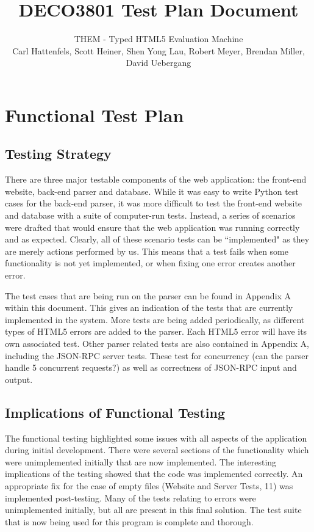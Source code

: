 \documentclass[10pt]{article}
\title{\bf DECO3801 Test Plan Document}
\author{\normalsize THEM - Typed HTML5 Evaluation Machine \\ \normalsize Carl Hattenfels, Scott Heiner, Shen Yong Lau, Robert Meyer, Brendan Miller, David Uebergang}
\date{}
\begin{document}
\maketitle
\tableofcontents
\newpage

\section{Functional Test Plan}

\subsection{Testing Strategy}

There are three major testable components of the web application: the front-end website, back-end parser and database. While it was easy to write Python test cases for the back-end parser, it was more difficult to test the front-end website and database with a suite of computer-run tests. Instead, a series of scenarios were drafted that would  ensure that the web application was running correctly and as expected. Clearly, all of these scenario tests can be ``implemented" as they are merely actions performed by us. This means that a test fails when some functionality is not yet implemented, or when fixing one error creates another error.

The test cases that are being run on the parser can be found in Appendix A within this document. This gives an indication of the tests that are currently implemented in the system. More tests are being added periodically, as different types of HTML5 errors are added to the parser. Each HTML5 error will have its own associated test. Other parser related tests are also contained in Appendix A, including the JSON-RPC server tests. These test for concurrency (can the parser handle 5 concurrent requests?) as well as correctness of JSON-RPC input and output.

\subsection{Implications of Functional Testing}

The functional testing highlighted some issues with all aspects of the application during initial development. There were several sections of the functionality which were unimplemented initially that are now implemented. The interesting implications of the testing showed that the code was implemented correctly. An appropriate fix for the case of empty files (Website and Server Tests, 11) was implemented post-testing. Many of the tests relating to errors were unimplemented initially, but all are present in this final solution. The test suite that is now being used for this program is complete and thorough.
\end{document}
